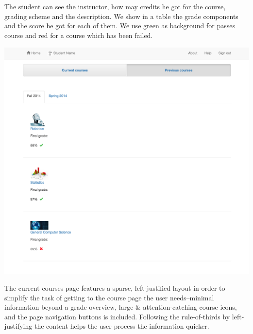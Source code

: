 The student can see the instructor, how may credits he got for the course, grading scheme and the description. We show in a table the grade components and the score he got for each of them. We use green as background for passes course and red for a course which has been failed.

\includegraphics[width=\textwidth]{screenshots/PreviousCourses.png}

The current courses page features a sparse, left-justified layout in order to simplify the task of getting to the course page the user needs--minimal information beyond a grade overview, large \& attention-catching course icons, and the page navigation buttons is included. Following the rule-of-thirds by left-justifying the content helps the user process the information quicker.
